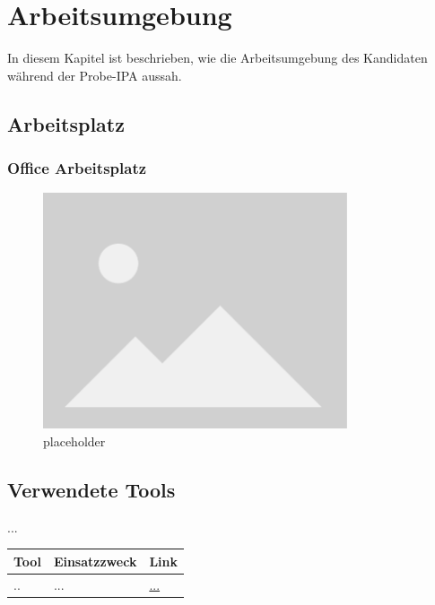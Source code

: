 \chapter{Arbeitsumgebung}\label{ch:arbeitsumgebung}
In diesem Kapitel ist beschrieben, wie die Arbeitsumgebung des Kandidaten während der Probe-IPA aussah.


\section{Arbeitsplatz}\label{sec:arbeitsplatz}
\subsection{Office Arbeitsplatz}\label{subsec:office-arbeitsplatz}

\begin{figure}[H]
    \begin{center}
        \includegraphics[width=0.8\textwidth]{ressourcen/placeholder}
        \caption[placeholder]{placeholder}\label{fig:placeholder}
    \end{center}
\end{figure}

\section{Verwendete Tools}\label{sec:verwendete-tools}
...

\renewcommand{\arraystretch}{1.5}
\begin{longtable}{|p{}|p{}|p{}|}
    \hline
    \textbf{Tool}                    & \textbf{Einsatzzweck}                                                 & \textbf{Link}                                      \\ \hline
    ..                               & ...                                                                   & \url{...}                    \\ \hline
\end{longtable}
\renewcommand{\arraystretch}{1}
\newpage